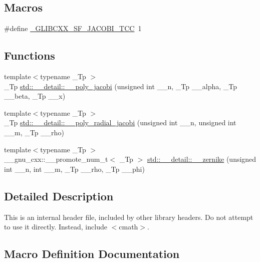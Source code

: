 \subsection*{Macros}
\begin{DoxyCompactItemize}
\item 
\#define \hyperlink{sf__jacobi_8tcc_a5aaa350a13d7d5da211f2b2bbdd648bb}{\+\_\+\+G\+L\+I\+B\+C\+X\+X\+\_\+\+S\+F\+\_\+\+J\+A\+C\+O\+B\+I\+\_\+\+T\+CC}~1
\end{DoxyCompactItemize}
\subsection*{Functions}
\begin{DoxyCompactItemize}
\item 
{\footnotesize template$<$typename \+\_\+\+Tp $>$ }\\\+\_\+\+Tp \hyperlink{namespacestd_1_1____detail_a7fcc47c397903ac177380517e94153c6}{std\+::\+\_\+\+\_\+detail\+::\+\_\+\+\_\+poly\+\_\+jacobi} (unsigned int \+\_\+\+\_\+n, \+\_\+\+Tp \+\_\+\+\_\+alpha, \+\_\+\+Tp \+\_\+\+\_\+beta, \+\_\+\+Tp \+\_\+\+\_\+x)
\item 
{\footnotesize template$<$typename \+\_\+\+Tp $>$ }\\\+\_\+\+Tp \hyperlink{namespacestd_1_1____detail_af325d47042bc9661bbde61b13f368fec}{std\+::\+\_\+\+\_\+detail\+::\+\_\+\+\_\+poly\+\_\+radial\+\_\+jacobi} (unsigned int \+\_\+\+\_\+n, unsigned int \+\_\+\+\_\+m, \+\_\+\+Tp \+\_\+\+\_\+rho)
\item 
{\footnotesize template$<$typename \+\_\+\+Tp $>$ }\\\+\_\+\+\_\+gnu\+\_\+cxx\+::\+\_\+\+\_\+promote\+\_\+num\+\_\+t$<$ \+\_\+\+Tp $>$ \hyperlink{namespacestd_1_1____detail_aa7d33201bdf73b58250d6a7ede44e896}{std\+::\+\_\+\+\_\+detail\+::\+\_\+\+\_\+zernike} (unsigned int \+\_\+\+\_\+n, int \+\_\+\+\_\+m, \+\_\+\+Tp \+\_\+\+\_\+rho, \+\_\+\+Tp \+\_\+\+\_\+phi)
\end{DoxyCompactItemize}


\subsection{Detailed Description}
This is an internal header file, included by other library headers. Do not attempt to use it directly. Instead, include $<$cmath$>$. 

\subsection{Macro Definition Documentation}
